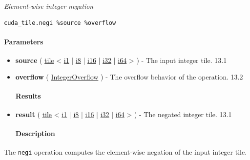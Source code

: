 \documentclass{article}
\begin{document}
\textit{Element-wise integer negation}


\begin{lstlisting}
cuda_tile.negi %source %overflow
\end{lstlisting}

\paragraph{Parameters}

\begin{itemize}
\item \textbf{source} ( \href{https://docs.nvidia.com/cuda/tile-ir/latest/sections/types.html#type-tile}{tile} < \href{https://docs.nvidia.com/cuda/tile-ir/latest/sections/types.html#subsection-element-types}{i1} | \href{https://docs.nvidia.com/cuda/tile-ir/latest/sections/types.html#subsection-element-types}{i8} | \href{https://docs.nvidia.com/cuda/tile-ir/latest/sections/types.html#subsection-element-types}{i16} | \href{https://docs.nvidia.com/cuda/tile-ir/latest/sections/types.html#subsection-element-types}{i32} | \href{https://docs.nvidia.com/cuda/tile-ir/latest/sections/types.html#subsection-element-types}{i64} > ) - The input integer tile. 13.1
\item \textbf{overflow} ( \href{https://docs.nvidia.com/cuda/tile-ir/latest/sections/operations.html#op-attribute-cuda-tile-negi-integeroverflow-attr}{IntegerOverflow} ) - The overflow behavior of the operation. 13.2


\paragraph{Results}

\item \textbf{result} ( \href{https://docs.nvidia.com/cuda/tile-ir/latest/sections/types.html#type-tile}{tile} < \href{https://docs.nvidia.com/cuda/tile-ir/latest/sections/types.html#subsection-element-types}{i1} | \href{https://docs.nvidia.com/cuda/tile-ir/latest/sections/types.html#subsection-element-types}{i8} | \href{https://docs.nvidia.com/cuda/tile-ir/latest/sections/types.html#subsection-element-types}{i16} | \href{https://docs.nvidia.com/cuda/tile-ir/latest/sections/types.html#subsection-element-types}{i32} | \href{https://docs.nvidia.com/cuda/tile-ir/latest/sections/types.html#subsection-element-types}{i64} > ) - The negated integer tile. 13.1


\paragraph{Description}

\end{itemize}
The \texttt{negi} operation computes the element-wise negation of the input integer tile.
\end{document}
